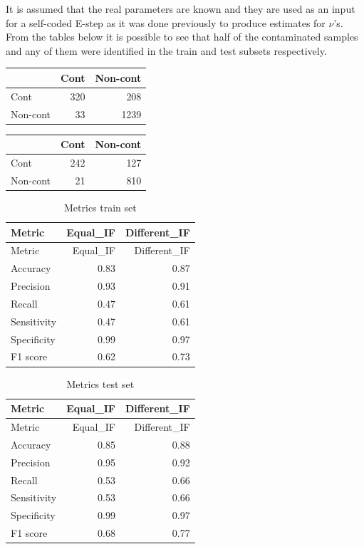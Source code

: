 \documentclass[
]{article}
\begin{document}
It is assumed that the real parameters are known and they are used as an
input for a self-coded E-step as it was done previously to produce
estimates for \(\nu\)'s. From the tables below it is possible to see
that half of the contaminated samples and any of them were identified in
the train and test subsets respectively.

\begin{longtable}[]{@{}lrr@{}}
\toprule\noalign{}
& Cont & Non-cont \\
\midrule\noalign{}
\endhead
\bottomrule\noalign{}
\endlastfoot
Cont & 320 & 208 \\
Non-cont & 33 & 1239 \\
\end{longtable}

\begin{longtable}[]{@{}lrr@{}}
\toprule\noalign{}
& Cont & Non-cont \\
\midrule\noalign{}
\endhead
\bottomrule\noalign{}
\endlastfoot
Cont & 242 & 127 \\
Non-cont & 21 & 810 \\
\end{longtable}

\begin{longtable}[]{@{}lrr@{}}
\caption{Metrics train set}\tabularnewline
\toprule\noalign{}
Metric & Equal\_IF & Different\_IF \\
\midrule\noalign{}
\endfirsthead
\toprule\noalign{}
Metric & Equal\_IF & Different\_IF \\
\midrule\noalign{}
\endhead
\bottomrule\noalign{}
\endlastfoot
Accuracy & 0.83 & 0.87 \\
Precision & 0.93 & 0.91 \\
Recall & 0.47 & 0.61 \\
Sensitivity & 0.47 & 0.61 \\
Specificity & 0.99 & 0.97 \\
F1 score & 0.62 & 0.73 \\
\end{longtable}

\begin{longtable}[]{@{}lrr@{}}
\caption{Metrics test set}\tabularnewline
\toprule\noalign{}
Metric & Equal\_IF & Different\_IF \\
\midrule\noalign{}
\endfirsthead
\toprule\noalign{}
Metric & Equal\_IF & Different\_IF \\
\midrule\noalign{}
\endhead
\bottomrule\noalign{}
\endlastfoot
Accuracy & 0.85 & 0.88 \\
Precision & 0.95 & 0.92 \\
Recall & 0.53 & 0.66 \\
Sensitivity & 0.53 & 0.66 \\
Specificity & 0.99 & 0.97 \\
F1 score & 0.68 & 0.77 \\
\end{longtable}
\end{document}
